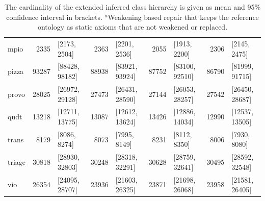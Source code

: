 \begin{table}[htbp]
\begin{tabular}{|l|r@{ }lr@{ }lr@{ }lr@{ }l|}
    mpio & 2335 & [2173, 2504] & 2363 & [2201, 2536] & 2055 & [1913, 2200] & 2306 & [2145, 2475] \\
    pizza & 93287 & [88428, 98182] & 88938 & [83921, 93924] & 87752 & [83100, 92510] & 86790 & [81999, 91715] \\
    provo & 28025 & [26972, 29128] & 27473 & [26431, 28590] & 27144 & [26053, 28257] & 27542 & [26450, 28687] \\
    qudt & 13218 & [12711, 13775] & 13087 & [12612, 13624] & 13426 & [12886, 14034] & 12990 & [12537, 13505] \\
    trans & 8179 & [8086, 8274] & 8073 & [7995, 8149] & 8231 & [8112, 8350] & 8006 & [7930, 8080] \\
    triage & 30818 & [28930, 32803] & 30248 & [28318, 32291] & 30628 & [28759, 32641] & 30495 & [28592, 32548] \\
    vio & 26354 & [24095, 28707] & 23936 & [21603, 26325] & 23871 & [21698, 26068] & 23958 & [21581, 26405] \\
    \hline
  \end{tabular}
  \caption{The cardinality of the extended inferred class hierarchy is given as mean and 95\% confidence interval in brackets. $^a$Weakening based repair that keeps the reference ontology as static axioms that are not weakened or replaced.}
\end{table}

